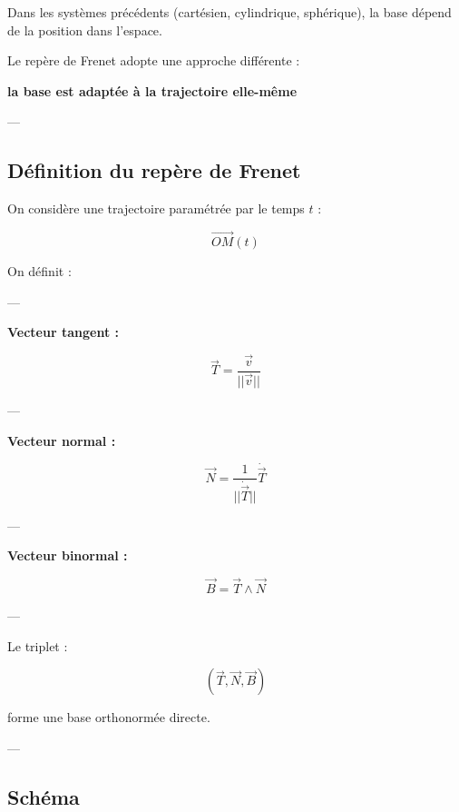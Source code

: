 \documentclass[11pt,a4paper]{article}
\begin{document}
Dans les systèmes précédents (cartésien, cylindrique, sphérique),
la base dépend de la position dans l’espace.

\bigskip

Le repère de Frenet adopte une approche différente :

\begin{center}
\textbf{la base est adaptée à la trajectoire elle-même}
\end{center}

---

\subsection{Définition du repère de Frenet}

On considère une trajectoire paramétrée par le temps $t$ :

\[
\vec{OM}(t)
\]

On définit :

---

\textbf{Vecteur tangent :}

\[
\vec{T} = \frac{\vec{v}}{||\vec{v}||}
\]

---

\textbf{Vecteur normal :}

\[
\vec{N} = \frac{1}{||\dot{\vec{T}}||} \dot{\vec{T}}
\]

---

\textbf{Vecteur binormal :}

\[
\vec{B} = \vec{T} \wedge \vec{N}
\]

---

Le triplet :

\[
(\vec{T}, \vec{N}, \vec{B})
\]

forme une base orthonormée directe.

---

\subsection{Schéma}

\begin{center}
\end{center}
\end{document}
